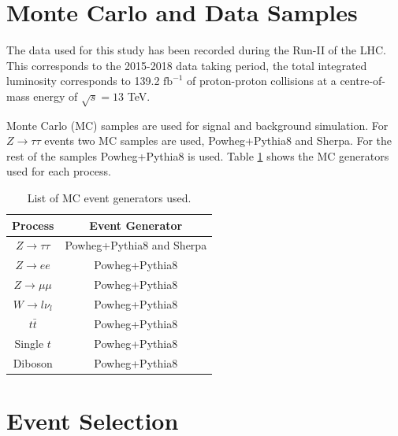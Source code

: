 \section{Monte Carlo and Data Samples}
The data used for this study has been recorded during the Run-II of the LHC. This corresponds to the 2015-2018 data taking period, the total integrated luminosity corresponds to 139.2 $\text{fb}^{-1}$ of proton-proton collisions at a centre-of-mass energy of $\sqrt{s}=13$ TeV.

Monte Carlo (MC) samples are used for signal and background simulation. For $Z\to\tau\tau$ events two MC samples are used, Powheg+Pythia8 and Sherpa. For the rest of the samples Powheg+Pythia8 is used. Table \ref{Table3} shows the MC generators used for each process.

\begin{table}[]
	\centering
	\begin{tabular}{cc}
		\hline
		\multicolumn{1}{|c|}{Process}  & \multicolumn{1}{c|}{Event Generator} \\ \hline
		$Z\to\tau\tau$                 & Powheg+Pythia8 and Sherpa            \\
		$Z\to ee$                      & Powheg+Pythia8                       \\
		$Z\to\mu\mu$                   & Powheg+Pythia8                       \\
		$W\to l\nu_l$				   & Powheg+Pythia8                       \\
		$t\bar{t}$                     & Powheg+Pythia8                       \\
		Single $t$                     & Powheg+Pythia8                       \\
		Diboson                        & Powheg+Pythia8                       \\ \hline
	\end{tabular}
	\caption{List of MC event generators used.}
	\label{Table3}
\end{table}
\section{Event Selection}
